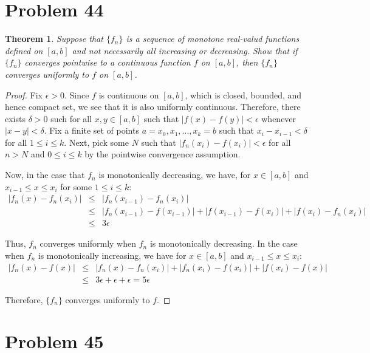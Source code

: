 \documentclass[psamsfonts]{amsart}
\newtheorem{thm}{Theorem}[section]
\theoremstyle{definition}
\theoremstyle{remark}
\numberwithin{equation}{section}
\begin{document}
\section{Problem 44}

\begin{thm}
Suppose that $\{ f_n \}$ is a sequence of monotone real-valud functions defined on $[a,b]$ and not necessarily all increasing or decreasing. Show that if $\{ f_n \}$ converges pointwise to a continuous function $f$ on $[a,b]$, then $\{ f_n \}$ converges uniformly to $f$ on $[a,b]$. 
\end{thm}

\begin{proof}
Fix $\epsilon > 0$. Since $f$ is continuous on $[a,b]$, which is closed, bounded, and hence compact set, we see that it is also uniformly continuous. Therefore, there exists $\delta > 0$ such for all $x,y \in [a,b]$ such that $|f(x) - f(y)| < \epsilon$ whenever $|x - y| < \delta$. Fix a finite set of points $a = x_0, x_1, \ldots, x_k = b$ such that $x_i - x_{i-1} < \delta$ for all $1 \leq i \leq k$. Next, pick some $N$ such that $|f_n(x_i) - f(x_i)| < \epsilon$ for all $n > N$ and $0 \leq i \leq k$ by the pointwise convergence assumption.

Now, in the case that $f_n$ is monotonically decreasing, we have, for $x \in [a,b]$ and $x_{i-1} \leq x \leq x_i$ for some $1 \leq i \leq k$:
\begin{eqnarray}
| f_n(x) - f_n(x_i)| &\leq& |f_n(x_{i-1}) - f_n(x_i)| \\
&\leq& |f_n( x_{i-1}) - f(x_{i-1}) | + |f(x_{i-1}) - f(x_i)| + |f(x_i) - f_n ( x_i)| \\
&\leq& 3 \epsilon
\end{eqnarray}

Thus, $f_n$ converges uniformly when $f_n$ is monotonically decreasing. In the case when $f_n$ is monotonically increasing, we have for $x \in [a,b]$ and $x_{i-1} \leq x \leq x_i$:
\begin{eqnarray}
|f_n(x) - f(x)| &\leq& |f_n(x) - f_n(x_i)| + |f_n(x_i) - f(x_i)| + |f(x_i) - f(x)| \\
&\leq& 3 \epsilon + \epsilon + \epsilon = 5 \epsilon 
\end{eqnarray} 

Therefore, $\{ f_n \}$ converges uniformly to $f$. 
\end{proof}

\section{Problem 45}
\end{document}
